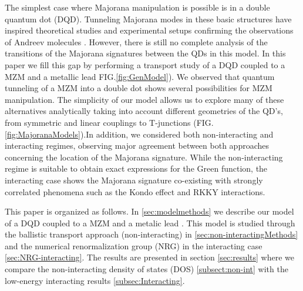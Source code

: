 \documentclass[showpacs,aps,prb,reprint,superscriptaddress]{revtex4-1}
\begin{document}
 The simplest case where Majorana manipulation is possible is in a double quantum dot (DQD). Tunneling Majorana modes in these basic structures have inspired theoretical studies \cite{silva_andreev_2016,ivanov_coherent_2017} and experimental setups confirming the observations of Andreev molecules \cite{su_andreev_2017}. However, there is still no complete analysis of the transitions of the Majorana signatures between the QDs in this model. In this paper we fill this gap by performing a transport study of a DQD coupled to a MZM and a metallic lead FIG.\ref{fig:GenModel}). We  observed that quantum tunneling of a MZM into a double dot shows several possibilities for MZM manipulation. The simplicity of our model allows us to explore many of these alternatives analytically taking into account different geometries of the QD's,  from symmetric and linear couplings to T-junctions (FIG.\ref{fig:MajoranaModels}).In addition, we considered both non-interacting and interacting regimes, observing major agreement between both approaches concerning the location of the Majorana signature. While the non-interacting regime is suitable to obtain exact expressions for the Green function, the interacting case  shows the Majorana signature co-existing with strongly correlated phenomena such as the Kondo effect \cite{hewson_kondo_1997} and RKKY interactions.   \cite{ruderman_indirect_1954,kasuya_theory_1956,yosida_magnetic_1957} 

This paper is organized as follows. In \ref{sec:modelmethods} we describe our model of a DQD coupled to a MZM and a metalic lead . This model is studied through the ballistic transport \cite{zubarev_double-time_1960} approach (non-interacting) in \ref{sec:non-interactingMethods} and the numerical renormalization group (NRG)\cite{bulla_numerical_2008} in the interacting case \ref{sec:NRG-interacting}. The results are presented in section \ref{sec:results} where we compare the non-interacting density of states (DOS) \ref{subsect:non-int} with the low-energy  interacting results \ref{subsec:Interacting}. 


\end{document}
